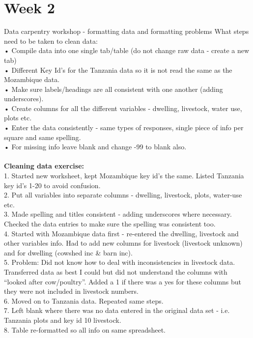 \documentclass{article}
\begin{document}
\section{Week 2}
Data carpentry workshop - formatting data and formatting problems 
What steps need to be taken to clean data:\\
•	Compile data into one single tab/table (do not change raw data - create a new tab) \\
•	Different Key Id’s for the Tanzania data so it is not read the same as the Mozambique data.\\
•	Make sure labels/headings are all consistent with one another (adding underscores).\\
•	Create columns for all the different variables - dwelling, livestock, water use, plots etc.\\
•	Enter the data consistently - same types of responses, single piece of info per square and same spelling.\\
•	For missing info leave blank and change -99 to blank also.\\
\\
\textbf{Cleaning data exercise:}\\
1.	Started new worksheet, kept Mozambique key id’s the same. Listed Tanzania key id’s 1-20 to avoid confusion. \\
2.	Put all variables into separate columns - dwelling, livestock, plots, water-use etc.\\
3.	Made spelling and titles consistent - adding underscores where necessary. Checked the data entries to make sure the spelling was consistent too.\\
4.	Started with Mozambique data first - re-entered the dwelling, livestock and other variables info. Had to add new columns for livestock (livestock unknown) and for dwelling (cowshed inc & barn inc). \\
5.	Problem:  Did not know how to deal with inconsistencies in livestock data. Transferred data as best I could but did not understand the columns with “looked after cow/poultry”. Added a 1 if there was a yes for these columns but they were not included in livestock numbers. \\
6.	Moved on to Tanzania data. Repeated same steps. \\
7.	Left blank where there was no data entered in the original data set - i.e. Tanzania plots and key id 10 livestock. \\
8.	Table re-formatted so all info on same spreadsheet. \\
\end{document}
